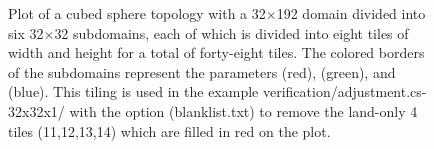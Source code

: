 \begin{figure}
\begin{center}
\end{center} 

\caption{Plot of a cubed sphere topology with a 32$\times$192 domain
divided into six 32$\times$32 subdomains, each of which is divided
into eight tiles of width  and height  for a 
total of forty-eight tiles. The colored borders of the subdomains 
represent the parameters  (red),  (green), and
 (blue). 
This tiling is used in the example
verification/adjustment.cs-32x32x1/
with the option (blanklist.txt) to remove the land-only 4 tiles 
(11,12,13,14) which are filled in red on the plot.
} \label{fig:48tile}
\end{figure}

